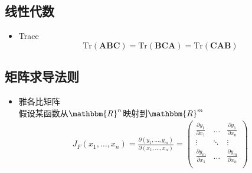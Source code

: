 \documentclass{article} 	%
\begin{document}
	\subsection{线性代数}
		\begin{itemize}
		\item
		Trace\\
		$$\mathrm{Tr}(\mathbf{ABC}) = \mathrm{Tr}(\mathbf{BCA}) =\mathrm{Tr}(\mathbf{CAB})$$ 
		\end{itemize}
	\subsection{矩阵求导法则}
		\begin{itemize}
		\item
		雅各比矩阵\\
		假设某函数从$\mathbbm{R}^n$映射到$\mathbbm{R}^m$
		\begin{eqnarray}
		J_{F}(x_1,\ldots,x_n) = \frac{\partial(y_1,\ldots,y_m)}{\partial(x_1,\ldots,x_n)} =
		\left(
			\begin{array}{ccc}
			\frac{\partial y_1}{\partial x_1}&\ldots&\frac{\partial y_1}{\partial x_n}\\
			\vdots&\ddots&\vdots\\
			\frac{\partial y_m}{\partial x_1}&\ldots&\frac{\partial y_m}{\partial x_n}\\
			\end{array}
		\right)
		\end{eqnarray}
		

\end{itemize}
\end{document}
